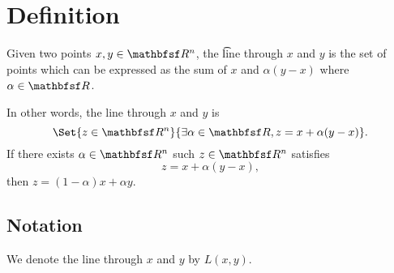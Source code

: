 
\section*{Definition}

Given two points $x, y \in \R ^n$, the \t{line} through $x$ and $y$ is the set of points which can be expressed as the sum of $x$ and $\alpha (y-x)$ where $\alpha  \in \R $.

In other words, the line through $x$ and $y$ is
  \[
\Set{z \in \R ^n}{\exists \alpha  \in \R , z = x + \alpha (y - x)}.
  \]
If there exists $\alpha  \in \R ^n$ such $z \in \R ^n$ satisfies
    \[
z = x + \alpha (y - x),
    \]
then $z = (1 - \alpha )x + \alpha y$.

\subsection*{Notation}

We denote the line through $x$ and $y$ by $L(x,y)$.

\blankpage